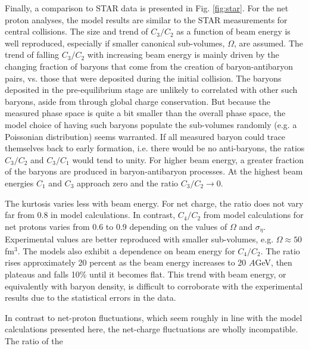 Finally, a comparison to STAR data is presented in Fig. \ref{fig:star}. For the net proton analyses, the model results are similar to the STAR measurements for central collisions. The size and trend of $C_3/C_2$ as a function of beam energy is well reproduced, especially if smaller canonical sub-volumes, $\Omega$, are assumed. The trend of falling $C_3/C_2$ with increasing beam energy is mainly driven by the changing fraction of baryons that come from the creation of baryon-antibaryon pairs, vs. those that were deposited during the initial collision. The baryons deposited in the pre-equilibrium stage are unlikely to correlated with other such baryons, aside from through global charge conservation. But because the measured phase space is quite a bit smaller than the overall phase space, the model choice of having such baryons populate the sub-volumes randomly (e.g. a Poissonian distribution) seems warranted. If all measured baryon could trace themselves back to early formation, i.e. there would be no anti-baryons, the ratios $C_3/C_2$ and $C_3/C_1$ would tend to unity. For higher beam energy, a greater fraction of the baryons are produced in baryon-antibaryon processes. At the highest beam energies $C_1$ and $C_3$ approach zero and the ratio $C_3/C_2\rightarrow 0$.

The kurtosis varies less with beam energy. For net charge, the ratio does not vary far from 0.8 in model calculations. In contrast, $C_4/C_2$ from model calculations for net protons varies from 0.6 to 0.9 depending on the values of $\Omega$ and $\sigma_\eta$. Experimental values are better reproduced with smaller sub-volumes, e.g. $\Omega\approx 50$ fm$^3$. The models also exhibit a dependence on beam energy for $C_4/C_2$. The ratio rises approximately 20 percent as the beam energy increases to 20 $A$GeV, then plateaus and falls 10\% until it becomes flat. This trend with beam energy, or equivalently with baryon density, is difficult to corroborate with the experimental results due to the statistical errors in the data.

In contrast to net-proton fluctuations, which seem roughly in line with the model calculations presented here, the net-charge fluctuations are wholly incompatible. The ratio of the 


